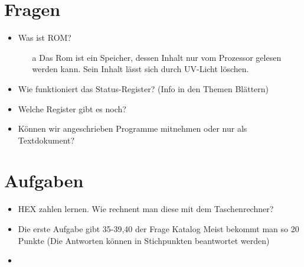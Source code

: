 \documentclass[
  ngerman
  ,12pt
  ,pdftex
]{article}
\begin{document}
  \section{Fragen}
  \begin{itemize}
    \item Was ist ROM?
    \begin{itemize}
      \item [a] Das Rom ist ein Speicher, dessen Inhalt nur vom Prozessor gelesen werden kann. Sein Inhalt lässt sich durch UV-Licht löschen.
    \end{itemize}
    \item Wie funktioniert das Status-Register? (Info in den Themen Blättern)
    \item Welche Register gibt es noch?
    \item Können wir angeschrieben Programme mitnehmen oder nur als Textdokument?
  \end{itemize}
  \section{Aufgaben}
  \begin{itemize}
    \item HEX zahlen lernen. Wie rechnent man diese mit dem Taschenrechner?
    \item Die erste Aufgabe gibt 35-39,40 der Frage Katalog
    Meist bekommt man so 20 Punkte (Die Antworten können in Stichpunkten beantwortet werden)
    \item 
  \end{itemize}


\newpage







    

    
\end{document}

